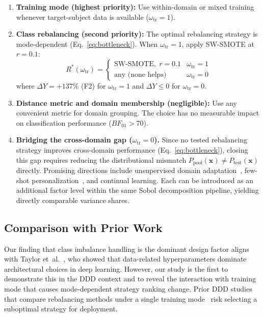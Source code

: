 \documentclass[lettersize,journal]{IEEEtran}
\begin{document}
\begin{enumerate}
\item \textbf{Training mode (highest priority):} Use within-domain or mixed training whenever target-subject data is available ($\omega_{\mathrm{tr}} = 1$).

\item \textbf{Class rebalancing (second priority):} The optimal rebalancing strategy is mode-dependent (Eq.~\eqref{eq:bottleneck}).
When $\omega_{\mathrm{tr}} = 1$, apply SW-SMOTE at $r = 0.1$:
\begin{equation}
\label{eq:recommended}
R^{*}(\omega_{\mathrm{tr}})\!=\!
\begin{cases}
\text{SW-SMOTE},\;r{=}0.1 & \!\omega_{\mathrm{tr}}{=}1 \\
\text{any (none helps)} & \!\omega_{\mathrm{tr}}{=}0
\end{cases}
\end{equation}
where $\Delta Y = +137\%$ (F2) for $\omega_{\mathrm{tr}} = 1$ and $\Delta Y \leq 0$ for $\omega_{\mathrm{tr}} = 0$.

\item \textbf{Distance metric and domain membership (negligible):} Use any convenient metric for domain grouping.
The choice has no measurable impact on classification performance ($BF_{01} > 70$).

\item \textbf{Bridging the cross-domain gap ($\omega_{\mathrm{tr}} = 0$).}
Since no tested rebalancing strategy improves cross-domain performance (Eq.~\eqref{eq:bottleneck}), closing this gap requires reducing the distributional mismatch $P_{\mathrm{pool}}(\mathbf{x}) \neq P_{\mathrm{test}}(\mathbf{x})$ directly.
Promising directions include unsupervised domain adaptation~\cite{pan2010,weiss2016}, few-shot personalization~\cite{kim2025}, and continual learning.
Each can be introduced as an additional factor level within the same Sobol decomposition pipeline, yielding directly comparable variance shares.
\end{enumerate}

\subsection{Comparison with Prior Work}\label{sec:comparison}
Our finding that class imbalance handling is the dominant design factor aligns with Taylor et~al.~\cite{taylor2021}, who showed that data-related hyperparameters dominate architectural choices in deep learning.
However, our study is the first to demonstrate this in the DDD context and to reveal the interaction with training mode that causes mode-dependent strategy ranking change.
Prior DDD studies that compare rebalancing methods under a single training mode~\cite{he2024,yadawadkar2018} risk selecting a suboptimal strategy for deployment.
\end{document}
